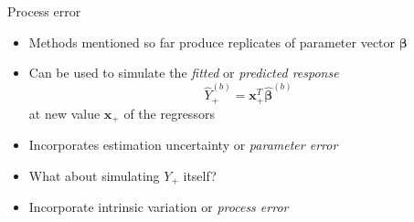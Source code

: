 \documentclass[tikz]{beamer}
\begin{document}
\begin{frame}{Process error}
    \begin{itemize}
        \item Methods mentioned so far produce replicates of parameter vector $\bm{\beta}$
        \item Can be used to simulate the \emph{fitted} or \emph{predicted response}
              \begin{equation*}
                  \widehat{Y}^{(b)}_+ = \mathbf{x}^T_+ \widehat{\bm{\beta}}^{(b)}
              \end{equation*}
              at new value $\mathbf{x_+}$ of the regressors
        \item Incorporates estimation uncertainty or \emph{parameter error}
        \item What about simulating $Y_+$ itself?
        \item Incorporate intrinsic variation or \emph{process error}
    \end{itemize}
\end{frame}
\end{document}
